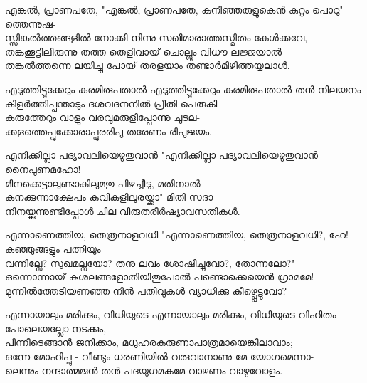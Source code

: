 \begin{enumerate}

\begin{slokam}{\VSv}{\VNM}{എങ്കൽ, പ്രാണപതേ,}
"എങ്കൽ, പ്രാണപതേ, കനിഞ്ഞരുളുകെൻ കുറ്റം പൊറു" -  ത്തെന്നുഷ- \\
സ്സിങ്കൽത്തങ്ങളിൽ നോക്കി നിന്നു സഖിമാരാത്തസ്മിതം കേൾക്കവേ,\\
തങ്കക്കൂട്ടിലിരുന്നു തത്ത തെളിവായ് ചൊല്ലും വിധൗ ലജ്ജയാൽ \\ 
തങ്കൽത്തന്നെ ലയിച്ചു പോയ് തരളയാം തണ്ടാർമിഴിത്തയ്യലാൾ. 
\end{slokam}




\begin{slokam}{\VSk}{\RV}{എടുത്തിട്ടൂക്കേറും കരമിരുപതാൽ}
എടുത്തിട്ടൂക്കേറും കരമിരുപതാൽ തൻ നിലയനം\\
കിളർത്തിപ്പന്താടും ദശവദനനിൽ പ്രീതി പെരുകി\\
കരുത്തേറും വാളും വരവുമരുളിപ്പോന്നു ചുടല-\\
ക്കളത്തെപ്പുക്കോരാപ്പുരരിപു തരേണം രിപുജയം.
\end{slokam}


\begin{slokam}{\VSk}{\VenM}{എനിക്കില്ലാ പദ്യാവലിയെഴുതുവാൻ}
"എനിക്കില്ലാ പദ്യാവലിയെഴുതുവാൻ നൈപുണമഹോ!\\
മിനക്കെട്ടാലുണ്ടാകിലുമതു പിഴച്ചീടു, മതിനാൽ\\
കനക്കുന്നാക്ഷേപം കവികളിലുരയ്ക്കാ" മിതി സദാ\\
നിനയ്ക്കുന്നുണ്ടിപ്പോള്‍ ചില വിരുതരീർഷ്യാവസതികള്‍.
\end{slokam}


\begin{slokam}{\VSv}{\HM}{എന്നാണെത്തിയ,  തെത്രനാളവധി}
"എന്നാണെത്തിയ,  തെത്രനാളവധി?, ഹേ! കുഞ്ഞുങ്ങളും പത്നിയും \\
വന്നില്ലേ? സുഖമല്ലയോ? തനു ലവം ശോഷിച്ചുവോ?, തോന്നലോ?" \\
ഒന്നൊന്നായ് കുശലങ്ങളോതിയിതുപോൽ പണ്ടൊക്കെയെൻ ഗ്രാമമേ! \\
മുന്നിൽത്തേടിയണഞ്ഞ നിൻ പതിവുകൾ വ്യാധിക്കു കീഴ്പ്പെട്ടുവോ?
\end{slokam}



\begin{slokam}{\VSr}{\Balendu}{എന്നായാലും മരിക്കും, വിധിയുടെ}
എന്നായാലും മരിക്കും, വിധിയുടെ വിഹിതം പോലെയല്ലോ നടക്കും,\\
പിന്നീടെങ്ങാന്‍ ജനിക്കാം, മധുഹരകരുണാപാത്രമായെങ്കിലാവാം;\\
ഒന്നേ മോഹിപ്പു - വീണ്ടും ധരണിയില്‍ വരുവാനാണു മേ യോഗമെന്നാ-\\
ലെന്നും നന്ദാത്മജന്‍ തന്‍ പദയുഗമകമേ വാഴണം വാഴുവോളം.
\end{slokam}


\end{enumerate}

